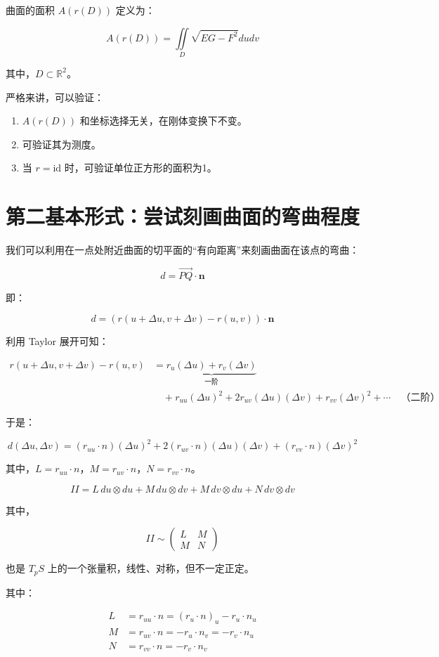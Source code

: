 \documentclass[lang=cn,10pt,thmcnt=section]{elegantbook}
\renewcommand{\vec}[1]{\mathbf{#1}}
\begin{document}
\begin{definition}[曲面面积]
    曲面的面积 $A(r(D))$ 定义为：

    $$
    A(r(D)) = \iint\limits_{D} \sqrt{EG - F^2} du dv
    $$

    其中，$D \subset \mathbb{R}^2$。
\end{definition}
\begin{remark}
    严格来讲，可以验证：
\begin{enumerate}
    \item $A(r(D))$ 和坐标选择无关，在刚体变换下不变。
    \item 可验证其为测度。
    \item  当 $r = \text{id}$ 时，可验证单位正方形的面积为1。
\end{enumerate}
\section{第二基本形式：尝试刻画曲面的弯曲程度}
我们可以利用在一点处附近曲面的切平面的“有向距离”来刻画曲面在该点的弯曲：

\[
d = \overrightarrow{PQ} \cdot \vec{n}
\]

即：

\[
d = \left( r(u + \Delta u, v + \Delta v) - r(u, v) \right) \cdot \vec{n}
\]

\end{remark}
利用 Taylor 展开可知：

$$
\begin{aligned}
r(u + \Delta u, v + \Delta v) - r(u, v) &= \underbrace{r_u (\Delta u) + r_v (\Delta v)}_{\text{一阶}} \\
&\quad + r_{uu} (\Delta u)^2 + 2 r_{uv} (\Delta u)(\Delta v) + r_{vv} (\Delta v)^2 + \cdots \quad \text{（二阶）}
\end{aligned}
$$

于是：

$$
d(\Delta u, \Delta v) = (r_{uu} \cdot n) (\Delta u)^2 + 2 (r_{uv} \cdot n) (\Delta u)(\Delta v) + (r_{vv} \cdot n) (\Delta v)^2
$$

其中，$L = r_{uu} \cdot n$，$M = r_{uv} \cdot n$，$N = r_{vv} \cdot n$。


\begin{definition}[ 第二基本形式]
    $$
II = L \, du \otimes du + M \, du \otimes dv + M \, dv \otimes du + N \, dv \otimes dv
$$

其中，

$$
II \sim \begin{pmatrix} L & M \\ M & N \end{pmatrix}
$$

也是 $T_p S$ 上的一个张量积，线性、对称，但不一定正定。

其中：

\begin{align*}
L &= r_{uu} \cdot n = (r_u \cdot n)_u - r_u \cdot n_u \\
M &= r_{uv} \cdot n = -r_u \cdot n_v = -r_v \cdot n_u \\
N &= r_{vv} \cdot n = -r_v \cdot n_v
\end{align*}
\end{definition}
\end{document}
